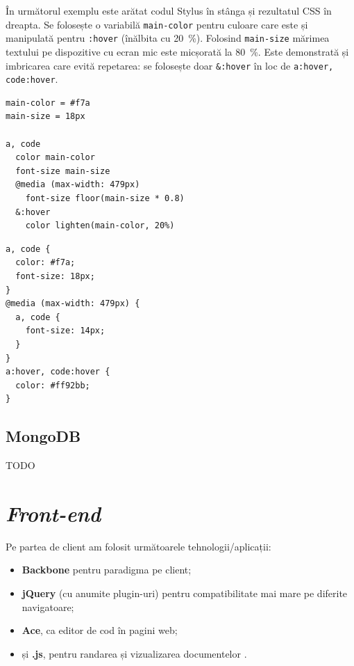 \documentclass[a4wide,12pt]{report}
\newcommand{\eng}[1]{\emph{#1}} %
\newcommand{\cod}[1]{\texttt{#1}}
\newcommand{\acr}[1]{{\textsmaller[1]{\textsc{#1}}}} %
\newcommand{\idee}[1]{{\color{red} #1}}
\begin{document}
În următorul exemplu este arătat codul Stylus în stânga și rezultatul CSS în
dreapta. Se folosește o variabilă \cod{main-color} pentru culoare care este și
manipulată pentru \cod{:hover} (înălbita cu 20~\%). Folosind \cod{main-size}
mărimea textului pe dispozitive cu ecran mic este micșorată la 80~\%. Este
demonstrată și imbricarea care evită repetarea: se folosește doar \cod{\&:hover}
în loc de \cod{a:hover, code:hover}.

\minipage{9cm}
\begin{verbatim}
main-color = #f7a
main-size = 18px

a, code
  color main-color
  font-size main-size
  @media (max-width: 479px)
    font-size floor(main-size * 0.8)
  &:hover
    color lighten(main-color, 20%)
\end{verbatim}
\endminipage
\minipage{4cm}
\begin{verbatim}
a, code {
  color: #f7a;
  font-size: 18px;
}
@media (max-width: 479px) {
  a, code {
    font-size: 14px;
  }
}
a:hover, code:hover {
  color: #ff92bb;
}
\end{verbatim}
\endminipage

\subsection{MongoDB}

\idee{TODO}

\section{\eng{Front-end}}

Pe partea de client am folosit următoarele tehnologii/aplicații:

\begin{itemize}

\item \textbf{Backbone} pentru paradigma \acr{MVC} pe client;

\item \textbf{jQuery} (cu anumite plugin-uri) pentru compatibilitate mai mare pe
diferite navigatoare;

\item \textbf{Ace}, ca editor de cod în pagini web;

\item și \textbf{\acr{PDF}.js}, pentru randarea și vizualizarea documentelor
\acr{PDF}.

\end{itemize}
\end{document}
